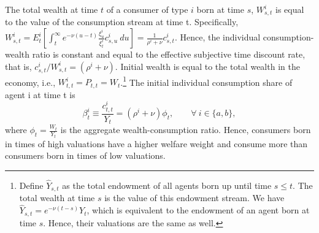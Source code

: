 \documentclass[preprint,11pt,authoryear]{elsarticle}
\theoremstyle{plain}
\begin{document}
The total wealth at time $t$ of a consumer of type $i$ born at time $s$, $W^i_{s,t}$ is equal to the value of the consumption stream at time t. Specifically, $W^i_{s,t} = E^i_{t}\left[\int_{t}^{\infty}  e^{-\nu \left(u-t\right)}  \frac{\xi^i_{u}}{\xi^i_{t}}  c^i_{s,u} \: du\right] = \frac{1}{\rho^i+\nu} c^i_{s,t}$. Hence, the individual consumption-wealth ratio is constant and equal to the effective subjective time discount rate, that is, $c^i_{s,t}/W^i_{s,t} = (\rho^i+\nu)$.
Initial wealth is equal to the total wealth in the economy, i.e., $W^i_{t,t}  = P_{t,t} = W_t$.\footnote{Define $\hat{Y}_{s,t}$ as the total endowment of all agents born up until time $s \leq t$. The total wealth at time $s$ is the value of this endowment stream. We have $\hat{Y}_{s,t} = e^{-\nu\left(t-s\right)}Y_t$, which is equivalent to the endowment of an agent born at time $s$. Hence, their valuations are the same as well.} The initial individual consumption share of agent i at time t is 
\begin{equation} \label{eq:beta}
	\beta^i_t \equiv  \frac{c^i_{t,t}}{Y_t} =\left(\rho^i + \nu\right)\phi_t, \qquad \forall \: i \in \lbrace a, b \rbrace, 
\end{equation} 
where $\phi_t = \frac{W_t}{Y_t}$ is the aggregate wealth-consumption ratio. Hence, consumers born in times of high valuations have a higher welfare weight and consume more than consumers born in times of low valuations. 
\end{document}
